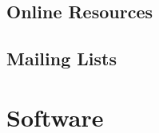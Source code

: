 \documentclass[a4paper,12pt]{report}
\begin{document}


\subsection{Online Resources}



\subsection{Mailing Lists}



\section{Software}


\end{document}
